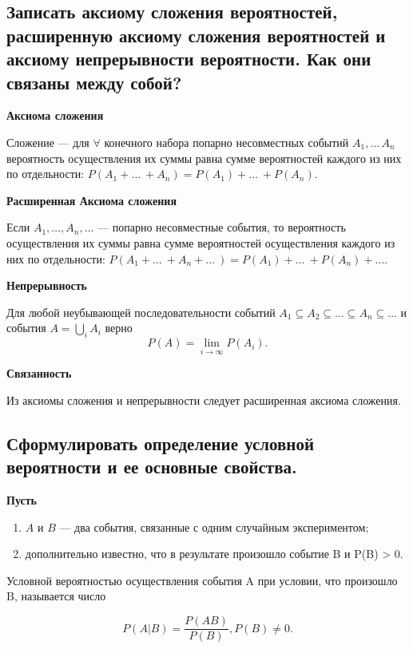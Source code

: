 \subsection{Записать аксиому сложения вероятностей, расширенную аксиому сложения вероятностей и аксиому непрерывности вероятности. Как они связаны между собой?}

\textbf{Аксиома сложения}

Сложение --- для $\forall$ конечного набора попарно несовместных событий $A_1, \dots\, A_n$ вероятность осуществления их суммы равна сумме вероятностей каждого из них по отдельности: $P(A_1 + \dots\ + A_n) = P(A_1) + \dots\ + P(A_n)$.

\textbf{Расширенная Аксиома сложения}

Если $A_1, \dots, A_n, \dots$ --- попарно несовместные события, то вероятность осуществления их суммы равна сумме вероятностей осуществления каждого из них по отдельности:  $P(A_1 + \dots\ + A_n + \dots\ ) = P(A_1) + \dots\ + P(A_n) + \dots$.

\textbf{Непрерывность}

Для любой неубывающей последовательности событий $A_1 \subseteq A_2 \subseteq \dots \subseteq A_n \subseteq \dots$ и события $ A = \bigcup\limits_i A_i$ верно 
\begin{equation}
	P(A) = \lim\limits_{i \rightarrow \infty} P(A_i).
\end{equation}

\textbf{Связанность}

Из аксиомы сложения и непрерывности следует расширенная аксиома сложения.

\subsection{Сформулировать определение условной вероятности и ее основные свойства.}

\textbf{Пусть} 

\begin{enumerate}
	\item $A$ и $B$ --- два события, связанные с одним случайным экспериментом;
	\item дополнительно известно, что в результате произошло событие B и P(B) > 0.
\end{enumerate}

Условной вероятностью осуществления события A при условии, что произошло B, называется число

\begin{equation}
	P(A|B) = \frac{P(AB)}{P(B)}, P(B) \neq 0.
\end{equation}

